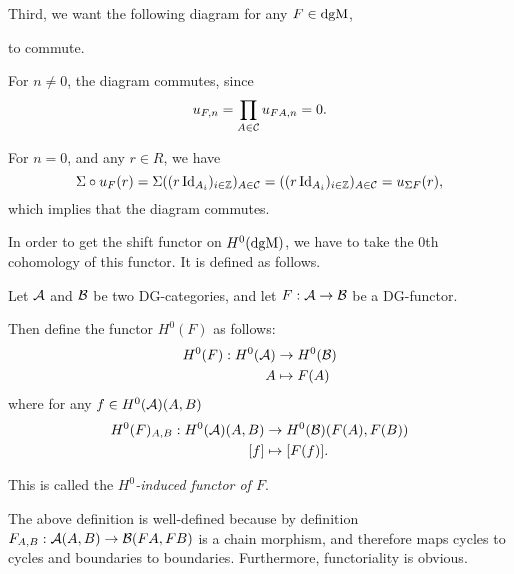 \begin{remark}
    Third, we want the following diagram for any \( F \in \operatorname{dgM} \),
    \begin{center}
    \end{center}
    to commute.

    For \( n \neq 0 \), the diagram commutes, since 
    \[
        u_{F, n} = \prod_{A \in {\mathcal{C}}} u_{F A, n} = 0.
    \]

    For \( n = 0 \), and any \( r \in R \), we have
    \[
        \Sigma \circ u_F (r) = \Sigma ((r \operatorname{Id}_{A_i})_{i \in {\mathbb{Z}}})_{A \in {\mathcal{C}}} = ((r \operatorname{Id}_{A_i})_{i \in {\mathbb{Z}}})_{A \in {\mathcal{C}}} = u_{\Sigma F} (r),
    \]
    which implies that the diagram commutes.
\end{remark}

In order to get the shift functor on \( H^0(\operatorname{dgM}) \), we have to take the \( 0 \)th cohomology of this functor. It is defined as follows.

\begin{definition}
    \label{def:H^0-induced_functor}
    Let \( {\mathcal{A}} \) and \( {\mathcal{B}} \) be two DG-categories, and let \( F: {\mathcal{A}} \to {\mathcal{B}} \) be a DG-functor.

    Then define the functor \( H^0(F) \) as follows:
    \begin{align*}
        H^0(F): H^0({\mathcal{A}}) &\to H^0({\mathcal{B}}) \\
        A &\mapsto F(A)
    \end{align*}
    where for any \( f \in H^0({\mathcal{A}})(A, B) \)
    \begin{align*}
        H^0(F)_{A, B}: H^0({\mathcal{A}})(A, B) &\to H^0({\mathcal{B}})(F(A), F(B)) \\
        [f] &\mapsto [F(f)].
    \end{align*}

    This is called the \emph{\( H^0 \)-induced functor of \( F \)}.
\end{definition}

The above definition is well-defined because by definition \( F_{A, B}: {\mathcal{A}}(A, B) \to {\mathcal{B}}(F A, F B) \) is a chain morphism, and therefore maps cycles to cycles and boundaries to boundaries. Furthermore, functoriality is obvious.

